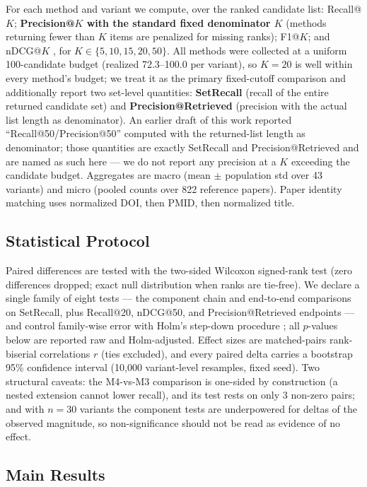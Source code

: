 \documentclass[nonacm,sigconf]{acmart}
\begin{document}
For each method and variant we compute, over the ranked candidate list:
Recall@$K$; \textbf{Precision@$K$ with the standard fixed denominator $K$}
(methods returning fewer than $K$ items are penalized for missing ranks);
F1@$K$; and nDCG@$K$ \cite{jarvelin2002cumulated}, for
$K \in \{5, 10, 15, 20, 50\}$. All methods were collected at a uniform
100-candidate budget (realized 72.3--100.0 per variant), so $K{=}20$ is
well within every method's budget; we treat it as the primary fixed-cutoff
comparison and additionally report two set-level quantities:
\textbf{SetRecall} (recall of the entire returned candidate set) and
\textbf{Precision@Retrieved} (precision with the actual list length as
denominator). An earlier draft of this work reported
``Recall@50/Precision@50'' computed with the returned-list length as
denominator; those quantities are exactly SetRecall and
Precision@Retrieved and are named as such here --- we do not report any
precision at a $K$ exceeding the candidate budget. Aggregates are macro
(mean $\pm$ population std over 43 variants) and micro (pooled counts over
822 reference papers). Paper identity matching uses normalized DOI, then
PMID, then normalized title.

\subsection{Statistical Protocol}
\label{sec:stats}

Paired differences are tested with the two-sided Wilcoxon signed-rank test
\cite{wilcoxon1945individual} (zero differences dropped; exact null
distribution when ranks are tie-free). We declare a single family of eight
tests --- the component chain and end-to-end comparisons on SetRecall,
plus Recall@20, nDCG@50, and Precision@Retrieved endpoints --- and control
family-wise error with Holm's step-down procedure \cite{holm1979simple};
all $p$-values below are reported raw and Holm-adjusted. Effect sizes are
matched-pairs rank-biserial correlations $r$ (ties excluded), and every
paired delta carries a bootstrap 95\% confidence interval (10{,}000
variant-level resamples, fixed seed). Two structural caveats: the M4-vs-M3
comparison is one-sided by construction (a nested extension cannot lower
recall), and its test rests on only 3 non-zero pairs; and with $n{=}30$
variants the component tests are underpowered for deltas of the observed
magnitude, so non-significance should not be read as evidence of no
effect.

\subsection{Main Results}
\label{sec:main}
\end{document}

